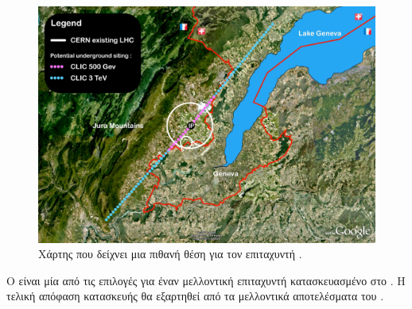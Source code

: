 \begin{figure}[tph]
\includegraphics[width=\linewidth]{images/CLIC-potential-location}
\centering
\caption{Χάρτης που δείχνει μια πιθανή θέση για τον επιταχυντή  \cite{Aicheler2012}.}
\label{img:CLIC-potential-location}
\end{figure}

Ο  είναι μία από τις επιλογές για έναν μελλοντική επιταχυντή κατασκευασμένο στο . 
Η τελική απόφαση κατασκευής θα εξαρτηθεί από τα μελλοντικά αποτελέσματα του .

